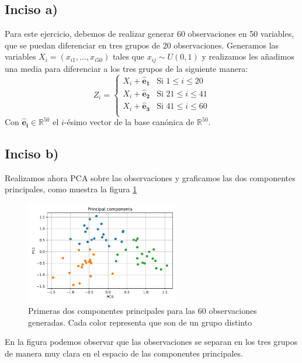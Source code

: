 \documentclass[11pt]{article}
\begin{document}
\subsection{Inciso a)}
Para este ejercicio, debemos de realizar generar 60 observaciones en 50 variables, que se puedan diferenciar en tres grupos de 20 observaciones. Generamos las variables $X_i = (x_{i1},\ldots, x_{i50})$ tales que $x_{ij} \sim U(0,1)$ y realizamos les añadimos una media para diferenciar a los tres grupos de la siguiente manera:
\begin{equation}
    Z_i = \begin{cases}
        X_i + \bm{\hat{e}_1} & \text{Si } 1 \leq i \leq 20 \\
        X_i + \bm{\hat{e}_2} & \text{Si } 21 \leq i \leq 41 \\
        X_i + \bm{\hat{e}_3} & \text{Si } 41 \leq i \leq 60 \\
    \end{cases}
\end{equation}
Con $\bm{\hat{e}_i} \in \mathbb{R}^{50}$ el $i$-ésimo vector de la base canónica de $\mathbb{R}^{50}$.
\subsection{Inciso b)}
Realizamos ahora PCA sobre las observaciones y graficamos las dos componentes principales, como muestra la figura \ref{3-pca}
\begin{figure}[H]
    \centering
    \includegraphics[width = 0.6\textwidth]{3-pca}
    \caption{Primeras dos componentes principales para las 60 observaciones generadas. Cada color representa que son de un grupo distinto}
    \label{3-pca}
\end{figure}
En la figura podemos observar que las observaciones se separan en los tres grupos de manera muy clara en el espacio de las componentes principales.
\end{document}
